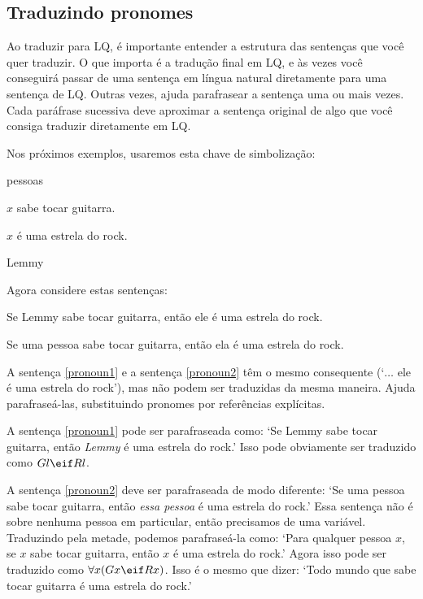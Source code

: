 \subsection{Traduzindo pronomes}
Ao traduzir para LQ, é importante entender a estrutura das sentenças que você quer traduzir. O que importa é a tradução final em LQ, e às vezes você conseguirá passar de uma sentença em língua natural diretamente para uma sentença de LQ. Outras vezes, ajuda parafrasear a sentença uma ou mais vezes. Cada paráfrase sucessiva deve aproximar a sentença original de algo que você consiga traduzir diretamente em LQ.

Nos próximos exemplos, usaremos esta chave de simbolização:

\begin{ekey}
\item[UD:] pessoas
\item[Gx:] $x$ sabe tocar guitarra.
\item[Rx:] $x$ é uma estrela do rock.
\item[l:] Lemmy
\end{ekey}

Agora considere estas sentenças:

\begin{earg}
\item[\ex{pronoun1}] Se Lemmy sabe tocar guitarra, então ele é uma estrela do rock.
\item[\ex{pronoun2}] Se uma pessoa sabe tocar guitarra, então ela é uma estrela do rock.
\end{earg}

A sentença \ref{pronoun1} e a sentença \ref{pronoun2} têm o mesmo consequente (`$\ldots$ ele é uma estrela do rock'), mas não podem ser traduzidas da mesma maneira. Ajuda parafraseá-las, substituindo pronomes por referências explícitas.

A sentença \ref{pronoun1} pode ser parafraseada como: `Se Lemmy sabe tocar guitarra, então \emph{Lemmy} é uma estrela do rock.' Isso pode obviamente ser traduzido como $Gl \eif Rl$.

A sentença \ref{pronoun2} deve ser parafraseada de modo diferente: `Se uma pessoa sabe tocar guitarra, então \emph{essa pessoa} é uma estrela do rock.' Essa sentença não é sobre nenhuma pessoa em particular, então precisamos de uma variável. Traduzindo pela metade, podemos parafraseá-la como: `Para qualquer pessoa $x$, se $x$ sabe tocar guitarra, então $x$ é uma estrela do rock.' Agora isso pode ser traduzido como $\forall x (Gx \eif Rx)$. Isso é o mesmo que dizer: `Todo mundo que sabe tocar guitarra é uma estrela do rock.'


